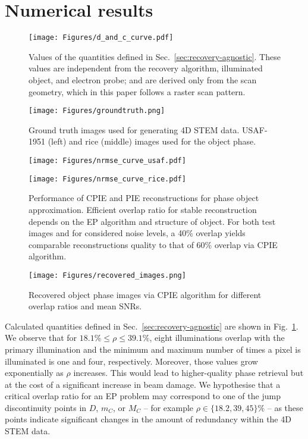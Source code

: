 \documentclass[11pt,draftclsnofoot,onecolumn]{IEEEtran}
\begin{document}
\section{Numerical results}\label{sec:numerical-results}
\begin{figure}[!tb]
    \centering
    \texttt{[image: Figures/d\_and\_c\_curve.pdf]}
    \caption{Values of the quantities defined in Sec.~\ref{sec:recovery-agnostic}. These values are independent from the recovery algorithm, illuminated object, and electron probe; and are derived only from the scan geometry, which in this paper follows a raster scan pattern.}
    \label{fig:d_and_c_curve}
\end{figure}
\begin{figure}[tb]
    \centering
    \texttt{[image: Figures/groundtruth.png]}
    \caption{Ground truth images used for generating 4D STEM data. USAF-1951 (left) and rice (middle) images used for the object phase.}
    \label{fig:groundtruth}
\end{figure}
\begin{figure*}[!tbh]
    \begin{minipage}{\linewidth}
    \centering
    \begin{minipage}{0.49\linewidth}
    \centering
    \texttt{[image: Figures/nrmse\_curve\_usaf.pdf]}
    \end{minipage}
    \begin{minipage}{0.49\linewidth}
    \centering
    \texttt{[image: Figures/nrmse\_curve\_rice.pdf]}
    \end{minipage}
    \end{minipage}
    \caption{Performance of CPIE and PIE reconstructions for phase object approximation. Efficient overlap ratio for stable reconstruction depends on the EP algorithm and structure of object. For both test images and for considered noise levels, a 40\% overlap yields comparable reconstructions quality to that of 60\% overlap via CPIE algorithm.}
    \label{fig:nrmse_curves}
\end{figure*}
\begin{figure}[!tbh]
    \centering
    \texttt{[image: Figures/recovered\_images.png]}
    \caption{Recovered object phase images via CPIE algorithm for different overlap ratios and mean SNRs.}
    \label{fig:recovered_images}
\end{figure}
Calculated quantities defined in Sec.~\ref{sec:recovery-agnostic} are shown in Fig.~\ref{fig:d_and_c_curve}. We observe that for $18.1\%\le\rho\le 39.1\%$, eight illuminations overlap with the primary illumination and the minimum and maximum number of times a pixel is illuminated is one and four, respectively. Moreover, those values grow exponentially as $\rho$ increases. This would lead to higher-quality phase retrieval but at the cost of a significant increase in beam damage. We hypothesise that a critical overlap ratio for an EP problem may correspond to one of the jump discontinuity points in $D$, $m_C$, or $M_C$ -- for example $\rho \in \{18.2, 39, 45\}\%$ -- as these points indicate significant changes in the amount of redundancy within the 4D STEM data. 
\end{document}
